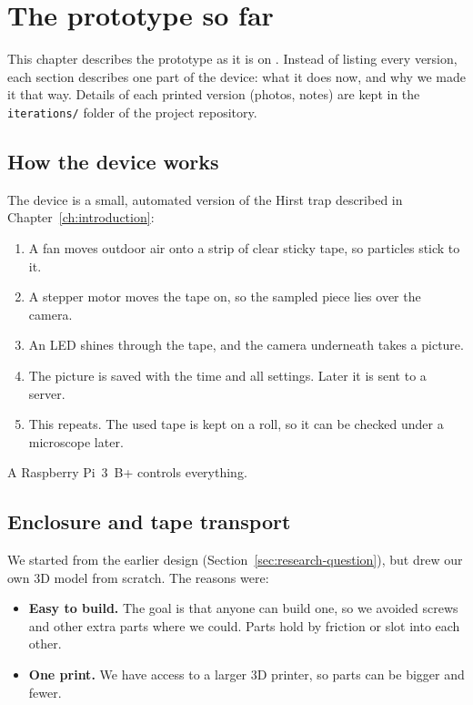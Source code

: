 \chapter{The prototype so far}\label{ch:prototype}

This chapter describes the prototype as it is on . Instead of listing
every version, each section describes one part of the device: what it does now, and why we
made it that way. Details of each printed version (photos, notes) are kept in the
\texttt{iterations/} folder of the project repository.

\section{How the device works}\label{sec:how-it-works}

The device is a small, automated version of the Hirst trap described in
Chapter~\ref{ch:introduction}:

\begin{enumerate}
  \item A fan moves outdoor air onto a strip of clear sticky tape, so particles stick to it.
  \item A stepper motor moves the tape on, so the sampled piece lies over the camera.
  \item An LED shines through the tape, and the camera underneath takes a picture.
  \item The picture is saved with the time and all settings. Later it is sent to a server.
  \item This repeats. The used tape is kept on a roll, so it can be checked under a microscope later.
\end{enumerate}

A Raspberry Pi~3~B+ controls everything. 

\section{Enclosure and tape transport}\label{sec:enclosure}

We started from the earlier design (Section~\ref{sec:research-question}), but drew our own 3D
model from scratch. The reasons were:

\begin{itemize}
  \item \textbf{Easy to build.} The goal is that anyone can build one, so we avoided screws
  and other extra parts where we could. Parts hold by friction or slot into each other.
  \item \textbf{One print.} We have access to a larger 3D printer, so parts can be bigger and
  fewer.
\end{itemize}

